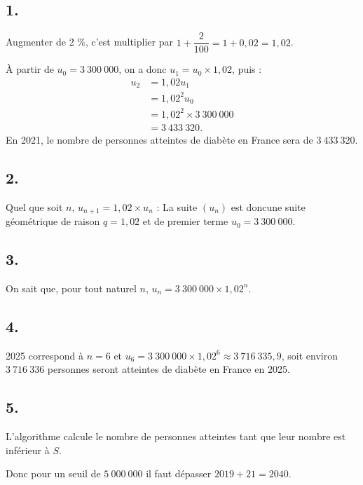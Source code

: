 \subsection*{1.}

Augmenter de 2 \%, c'est multiplier par \( 1 + \dfrac{2}{100} = 1 + 0{,}02 = 1{,}02 \).

À partir de \(u_0 = 3\ 300\ 000\), on a donc \(u_1 = u_0 \times 1{,}02\), puis :
\begin{align*}
u_2 &= 1{,}02 u_1 \\
&= 1{,}02^2 u_0 \\
&= 1{,}02^2 \times 3\ 300\ 000 \\
&= 3\ 433\ 320.
\end{align*}
En 2021, le nombre de personnes atteintes de diabète en France sera de \(3\ 433\ 320\).

\subsection*{2.}

Quel que soit \( n \), \( u_{n+1} = 1{,}02 \times u_n \) : La suite \( (u_n) \) est doncune suite géométrique de raison \(q = 1{,}02\) et de premier terme \( u_0 = 3\ 300\ 000 \).

\subsection*{3.}

On sait que, pour tout naturel \( n \), \( u_n = 3\ 300\ 000 \times 1{,}02^n \).

\subsection*{4.}

2025 correspond à \(n = 6\) et \(u_6 = 3\ 300\ 000 \times 1{,}02^6 \approx 3\ 716\ 335{,}9\), soit environ \(3\ 716\ 336\) personnes seront atteintes de diabète en France en 2025.

\subsection*{5.}

L'algorithme calcule le nombre de personnes atteintes tant que leur nombre est inférieur à \(S\).

Donc pour un seuil de \(5\ 000\ 000\) il faut dépasser \(2019 + 21 = 2040\).
